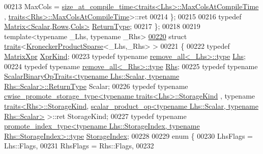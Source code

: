 \begin{DoxyCode}
00213     MaxCols = \hyperlink{struct_eigen_1_1internal_1_1size__at__compile__time}{size\_at\_compile\_time<traits<Lhs>::MaxColsAtCompileTime}
      , \hyperlink{struct_eigen_1_1internal_1_1traits}{traits<Rhs>::MaxColsAtCompileTime}>::ret
00214   \};
00215 
00216   \textcolor{keyword}{typedef} \hyperlink{group___core___module_class_eigen_1_1_matrix}{Matrix<Scalar,Rows,Cols>} \hyperlink{group___core___module_class_eigen_1_1_matrix}{ReturnType};
00217 \};
00218 
00219 \textcolor{keyword}{template}<\textcolor{keyword}{typename} \_Lhs, \textcolor{keyword}{typename} \_Rhs>
\hyperlink{struct_eigen_1_1internal_1_1traits_3_01_kronecker_product_sparse_3_01___lhs_00_01___rhs_01_4_01_4}{00220} \textcolor{keyword}{struct }\hyperlink{struct_eigen_1_1internal_1_1traits}{traits}<\hyperlink{class_eigen_1_1_kronecker_product_sparse}{KroneckerProductSparse}<\_Lhs,\_Rhs> >
00221 \{
00222   \textcolor{keyword}{typedef} \hyperlink{struct_eigen_1_1_matrix_xpr}{MatrixXpr} \hyperlink{struct_eigen_1_1_matrix_xpr}{XprKind};
00223   \textcolor{keyword}{typedef} \textcolor{keyword}{typename} \hyperlink{group___sparse_core___module}{remove\_all<\_Lhs>::type} \hyperlink{group___sparse_core___module}{Lhs};
00224   \textcolor{keyword}{typedef} \textcolor{keyword}{typename} \hyperlink{group___sparse_core___module}{remove\_all<\_Rhs>::type} \hyperlink{group___sparse_core___module}{Rhs};
00225   \textcolor{keyword}{typedef} \textcolor{keyword}{typename} 
      \hyperlink{group___core___module_struct_eigen_1_1_scalar_binary_op_traits}{ScalarBinaryOpTraits<typename Lhs::Scalar, typename Rhs::Scalar>::ReturnType}
       Scalar;
00226   \textcolor{keyword}{typedef} \textcolor{keyword}{typename} \hyperlink{struct_eigen_1_1internal_1_1cwise__promote__storage__type}{cwise\_promote\_storage\_type<typename traits<Lhs>::StorageKind}
      , \textcolor{keyword}{typename} \hyperlink{struct_eigen_1_1internal_1_1traits}{traits<Rhs>::StorageKind}, 
      \hyperlink{struct_eigen_1_1internal_1_1scalar__product__op}{scalar\_product\_op<typename Lhs::Scalar, typename Rhs::Scalar>}
       >::ret StorageKind;
00227   \textcolor{keyword}{typedef} \textcolor{keyword}{typename} 
      \hyperlink{struct_eigen_1_1internal_1_1conditional}{promote\_index\_type<typename Lhs::StorageIndex, typename Rhs::StorageIndex>::type}
       \hyperlink{struct_eigen_1_1internal_1_1conditional}{StorageIndex};
00228 
00229   \textcolor{keyword}{enum} \{
00230     LhsFlags = Lhs::Flags,
00231     RhsFlags = Rhs::Flags,
00232 

\end{DoxyCode}
